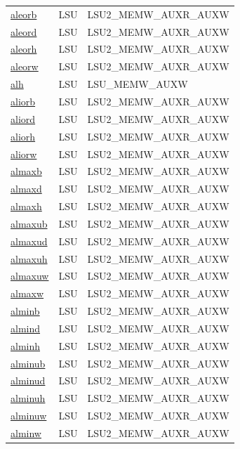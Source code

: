 \begin{small}
\begin{longtable}[l]{l l l}
\hyperlink{lvx.aleorb}{aleorb} & LSU & LSU2\_MEMW\_AUXR\_AUXW \\ 
\hyperlink{lvx.aleord}{aleord} & LSU & LSU2\_MEMW\_AUXR\_AUXW \\ 
\hyperlink{lvx.aleorh}{aleorh} & LSU & LSU2\_MEMW\_AUXR\_AUXW \\ 
\hyperlink{lvx.aleorw}{aleorw} & LSU & LSU2\_MEMW\_AUXR\_AUXW \\ 
\hyperlink{lvx.alh}{alh} & LSU & LSU\_MEMW\_AUXW \\ 
\hyperlink{lvx.aliorb}{aliorb} & LSU & LSU2\_MEMW\_AUXR\_AUXW \\ 
\hyperlink{lvx.aliord}{aliord} & LSU & LSU2\_MEMW\_AUXR\_AUXW \\ 
\hyperlink{lvx.aliorh}{aliorh} & LSU & LSU2\_MEMW\_AUXR\_AUXW \\ 
\hyperlink{lvx.aliorw}{aliorw} & LSU & LSU2\_MEMW\_AUXR\_AUXW \\ 
\hyperlink{lvx.almaxb}{almaxb} & LSU & LSU2\_MEMW\_AUXR\_AUXW \\ 
\hyperlink{lvx.almaxd}{almaxd} & LSU & LSU2\_MEMW\_AUXR\_AUXW \\ 
\hyperlink{lvx.almaxh}{almaxh} & LSU & LSU2\_MEMW\_AUXR\_AUXW \\ 
\hyperlink{lvx.almaxub}{almaxub} & LSU & LSU2\_MEMW\_AUXR\_AUXW \\ 
\hyperlink{lvx.almaxud}{almaxud} & LSU & LSU2\_MEMW\_AUXR\_AUXW \\ 
\hyperlink{lvx.almaxuh}{almaxuh} & LSU & LSU2\_MEMW\_AUXR\_AUXW \\ 
\hyperlink{lvx.almaxuw}{almaxuw} & LSU & LSU2\_MEMW\_AUXR\_AUXW \\ 
\hyperlink{lvx.almaxw}{almaxw} & LSU & LSU2\_MEMW\_AUXR\_AUXW \\ 
\hyperlink{lvx.alminb}{alminb} & LSU & LSU2\_MEMW\_AUXR\_AUXW \\ 
\hyperlink{lvx.almind}{almind} & LSU & LSU2\_MEMW\_AUXR\_AUXW \\ 
\hyperlink{lvx.alminh}{alminh} & LSU & LSU2\_MEMW\_AUXR\_AUXW \\ 
\hyperlink{lvx.alminub}{alminub} & LSU & LSU2\_MEMW\_AUXR\_AUXW \\ 
\hyperlink{lvx.alminud}{alminud} & LSU & LSU2\_MEMW\_AUXR\_AUXW \\ 
\hyperlink{lvx.alminuh}{alminuh} & LSU & LSU2\_MEMW\_AUXR\_AUXW \\ 
\hyperlink{lvx.alminuw}{alminuw} & LSU & LSU2\_MEMW\_AUXR\_AUXW \\ 
\hyperlink{lvx.alminw}{alminw} & LSU & LSU2\_MEMW\_AUXR\_AUXW \\ 

\end{longtable}
\end{small}
